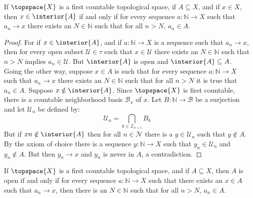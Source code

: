\documentclass{article}                                                        %
\begin{document}
        \begin{theorem}
            If $\topspace{X}$ is a first countable topological space, if
            $A\subseteq{X}$, and if $x\in{X}$, then $x\in\interior{A}$ if and
            only if for every sequence $a:\mathbb{N}\rightarrow{X}$ such that
            $a_{n}\rightarrow{x}$ there exists an $N\in\mathbb{N}$ such that for
            all $n>N$, $a_{n}\in{A}$.
        \end{theorem}
        \begin{proof}
            For if $x\in\interior{A}$, and if $a:\mathbb{N}\rightarrow{X}$ is a
            sequence such that $a_{n}\rightarrow{x}$, then for every open subset
            $\mathcal{U}\in\tau$ such that $x\in\mathcal{U}$ there exists an
            $N\in\mathbb{N}$ such that $n>N$ implies $a_{n}\in\mathcal{U}$.
            But $\interior{A}$ is open and $\interior{A}\subseteq{A}$. Going the
            other way, suppose $x\in{A}$ is such that for every sequence
            $a:\mathbb{N}\rightarrow{X}$ such that $a_{n}\rightarrow{x}$ there
            exists an $N\in\mathbb{N}$ such that for all $n>N$ it is true that
            $a_{n}\in{A}$. Suppose $x\notin\interior{A}$. Since $\topspace{X}$
            is first countable, there is a countable neighborhood basis
            $\mathcal{B}_{x}$ of $x$. Let $B:\mathbb{N}\rightarrow\mathcal{B}$
            be a surjection and let $\mathcal{U}_{n}$ be defined by:
            \begin{equation}
                \mathcal{U}_{n}=\bigcap_{k\in\mathbb{Z}_{n+1}}B_{k}
            \end{equation}
            But if $xn\notin\interior{A}$ then for all $n\in\mathcal{N}$ there
            is a $y\in\mathcal{U}_{n}$ such that $y\notin{A}$. By the axiom of
            choice there is a sequence $y:\mathbb{N}\rightarrow{X}$ such that
            $y_{n}\in\mathcal{U}_{n}$ and $y_{n}\notin{A}$. But then
            $y_{n}\rightarrow{x}$ and $y_{n}$ is never in $A$, a contradiction.
        \end{proof}
        \begin{theorem}
            If $\topspace{X}$ is a first countable topological space, and if
            $A\subseteq{X}$, then $A$ is open if and only if for every sequence
            $a:\mathbb{N}\rightarrow{X}$ such that there exists an $x\in{A}$
            such that $a_{n}\rightarrow{x}$, then there is an $N\in\mathbb{N}$
            such that for all $n>N$, $a_{n}\in{A}$.
        \end{theorem}
\end{document}
